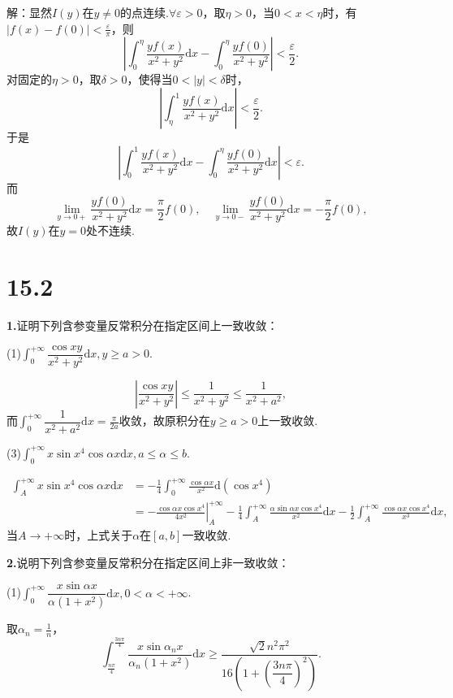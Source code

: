 \documentclass[12pt, a4paper]{article}
\newcommand{\dif}{\mathrm{d}}
\begin{document}
解：显然\(I(y)\)在\(y \neq 0\)的点连续.\(\forall \varepsilon > 0\)，取\(\eta > 0\)，当\(0 < x < \eta\)时，有\(|f(x) - f(0)| < \frac{\varepsilon}{\pi}\)，则
\[\left|\int_0^\eta \frac{yf(x)}{x^2 + y^2}\dif x - \int_0^\eta \frac{yf(0)}{x^2 + y^2}\right| < \frac{\varepsilon}{2}.\]
对固定的\(\eta > 0\)，取\(\delta > 0\)，使得当\(0 < |y| < \delta\)时，
\[\left|\int_\eta^1 \frac{yf(x)}{x^2 + y^2}\dif x\right| < \frac{\varepsilon}{2}.\]
于是
\[\left|\int_0^1 \frac{yf(x)}{x^2 + y^2}\dif x - \int_0^\eta \frac{yf(0)}{x^2 + y^2}\dif x\right| < \varepsilon.\]
而
\[\lim_{y \to 0+} \frac{yf(0)}{x^2 + y^2}\dif x = \frac{\pi}{2}f(0), \quad \lim_{y \to 0-} \frac{yf(0)}{x^2 + y^2}\dif x = -\frac{\pi}{2}f(0),\]
故\(I(y)\)在\(y = 0\)处不连续.

\section*{15.2}
\textbf{1.}证明下列含参变量反常积分在指定区间上一致收敛：

(1)\(\int_{0}^{+\infty} \dfrac{\cos xy}{x^2 + y^2}\dif x, y \geq a > 0\).

\[\left|\frac{\cos xy}{x^2 + y^2}\right| \leq \frac{1}{x^2 + y^2} \leq \frac{1}{x^2 + a^2},\]
而\(\int_{0}^{+\infty} \dfrac{1}{x^2 + a^2}\dif x = \frac{\pi}{2a}\)收敛，故原积分在\(y \geq a > 0\)上一致收敛.

(3)\(\int_{0}^{+\infty} x\sin x^4\cos\alpha x\dif x, a \leq \alpha \leq b\).

\begin{align*}
\int_{A}^{+\infty} x\sin x^4\cos\alpha x\dif x &= -\frac{1}{4}\int_{0}^{+\infty} \frac{\cos\alpha x}{x^2} \dif(\cos x^4) \\
&= -\left.\frac{\cos\alpha x\cos x^4}{4x^2}\right|_{A}^{+\infty} - \frac{1}{4}\int_{A}^{+\infty} \frac{\alpha\sin\alpha x\cos x^4}{x^2}\dif x - \frac{1}{2} \int_{A}^{+\infty} \frac{\cos\alpha x\cos x^4}{x^3}\dif x,
\end{align*}
当\(A \to +\infty\)时，上式关于\(\alpha\)在\([a, b]\)一致收敛.

\textbf{2.}说明下列含参变量反常积分在指定区间上非一致收敛：

(1)\(\int_{0}^{+\infty} \dfrac{x\sin\alpha x}{\alpha(1 + x^2)}\dif x, 0 < \alpha < +\infty\).

取\(\alpha_n = \frac{1}{n}\)，
\[\int_{\frac{n\pi}{4}}^{\frac{3n\pi}{4}} \frac{x\sin\alpha_n x}{\alpha_n(1 + x^2)}\dif x \geq \frac{\sqrt{2}n^2\pi^2}{16\left(1 + \left(\dfrac{3n\pi}{4}\right)^2\right)}.\]
\end{document}
